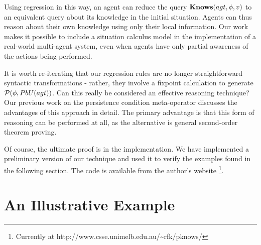 Using regression in this way, an agent can reduce the query $\mathbf{Knows}(agt,\phi,v)$
to an equivalent query about its knowledge in the initial situation.
Agents can thus reason about their own knowledge using only their
local information. Our work makes it possible to include a situation
calculus model in the implementation of a real-world multi-agent system,
even when agents have only partial awareness of the actions being
performed.

It is worth re-iterating that our regression rules are no longer straightforward
syntactic transformations - rather, they involve a fixpoint calculation
to generate $\mathcal{P}(\phi,PbU(agt))$. Can this really be considered
an effective reasoning technique? Our previous work on the persistence
condition meta-operator \citep{kelly07sc_persistence} discusses the
advantages of this approach in detail. The primary advantage is that
this form of reasoning can be performed at all, as the alternative
is general second-order theorem proving.

Of course, the ultimate proof is in the implementation. We have implemented
a preliminary version of our technique and used it to verify the examples
found in the following section. The code is available from the author's
website%
\footnote{Currently at http://www.csse.unimelb.edu.au/\textasciitilde{}rfk/pknows/%
}.


\section{An Illustrative Example\label{sub:An-Illustrative-Example}}

